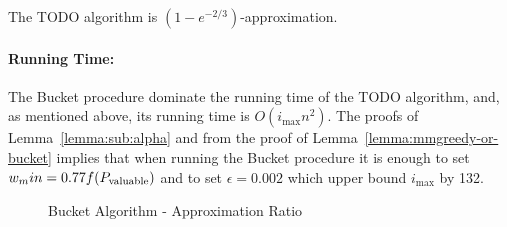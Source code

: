 \begin{theorem}
	The TODO algorithm is $(1 - e^{-2/3})$-approximation.
\end{theorem}

\paragraph{Running Time:}
The Bucket procedure dominate the running time of the TODO algorithm, and, as mentioned above, its running time is $O(i_{\max}n^2)$.
The proofs of Lemma~\ref{lemma:sub:alpha} and from the proof of Lemma~\ref{lemma:mmgreedy-or-bucket} implies that when running the Bucket procedure it is enough to set $w_min = 0.77f(P_{\text{valuable}})$ and to set $\epsilon = 0.002$ which upper bound $i_{\max}$ by 132.

\begin{figure}
	\def\zeta{0.002}
	\caption{
		\label{fig:sub:bucket}
		Bucket Algorithm - Approximation Ratio
	}
\end{figure}
